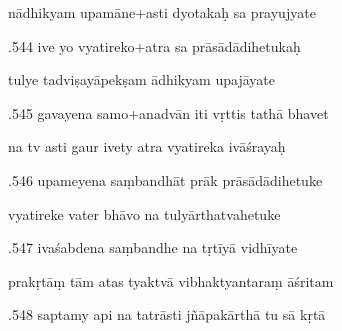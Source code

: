 \documentclass[article,12pt,a4paper]{memoir}%
\newcounter{parCount}
\begin{document}
	  
	  \pstart \leavevmode%
	nādhikyam upamāne+asti dyotakaḥ sa prayujyate 
	{}
	\pend%
      

	  
	  \pstart {}.544 ive yo vyatireko+atra sa prāsādādihetukaḥ 
	{}
	\pend%
      

	  
	  \pstart \leavevmode%
	tulye tadviṣayāpekṣam ādhikyam upajāyate 
	{}
	\pend%
      

	  
	  \pstart {}.545 gavayena samo+anadvān iti vṛttis tathā bhavet 
	{}
	\pend%
      

	  
	  \pstart \leavevmode%
	na tv asti gaur ivety atra vyatireka ivāśrayaḥ 
	{}
	\pend%
      

	  
	  \pstart {}.546 upameyena saṃbandhāt prāk prāsādādihetuke 
	{}
	\pend%
      

	  
	  \pstart \leavevmode%
	vyatireke vater bhāvo na tulyārthatvahetuke 
	{}
	\pend%
      

	  
	  \pstart {}.547 ivaśabdena saṃbandhe na tṛtīyā vidhīyate 
	{}
	\pend%
      

	  
	  \pstart \leavevmode%
	prakṛtāṃ tām atas tyaktvā vibhaktyantaraṃ āśritam 
	{}
	\pend%
      

	  
	  \pstart {}.548 saptamy api na tatrāsti jñāpakārthā tu sā kṛtā 
	{}
	\pend%
      
\end{document}
